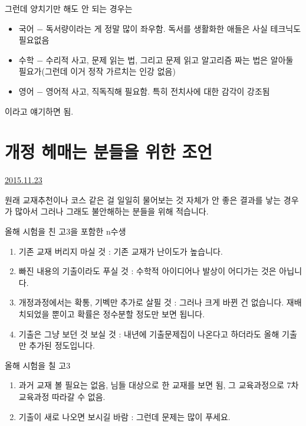 그런데 양치기만 해도 안 되는 경우는
\vspace{5mm}
\begin{itemize}
    \item 국어 $-$ 독서량이라는 게 정말 많이 좌우함. 독서를 생활화한 애들은 사실 테크닉도 필요없음
    \item 수학 $-$ 수리적 사고, 문제 읽는 법, 그리고 문제 읽고 알고리즘 짜는 법은 알아둘 필요가(그런데 이거 정작 가르치는 인강 없음)
    \item 영어 $-$ 영어적 사고, 직독직해 필요함. 특히 전치사에 대한 감각이 강조됨
\end{itemize}
\vspace{5mm}

이라고 얘기하면 됨.
\vspace{5mm}








\section{개정 헤매는 분들을 위한 조언}
\href{https://www.kockoc.com/Apoc/506939}{2015.11.23}

\vspace{5mm}

원래 교재추천이나 코스 같은 걸 일일히 물어보는 것 자체가 안 좋은 결과를 낳는 경우가 많아서 그러나
그래도 불안해하는 분들을 위해 적습니다.
\vspace{5mm}

올해 시험을 친 고3을 포함한 n수생
\vspace{5mm}
\begin{enumerate}
    \item 기존 교재 버리지 마실 것 : 기존 교재가 난이도가 높습니다.
    \item 빠진 내용의 기출이라도 푸실 것 : 수학적 아이디어나 발상이 어디가는 것은 아닙니다.
    \item 개정과정에서는 확통, 기벡만 추가로 살필 것 : 그러나 크게 바뀐 건 없습니다. 재배치되었을 뿐이고 확률은 정수분할 정도만 보면 됩니다.
    \item 기출은 그냥 보던 것 보실 것 : 내년에 기출문제집이 나온다고 하더라도 올해 기출만 추가된 정도입니다.
\end{enumerate}
\vspace{5mm}

올해 시험을 칠 고3
\vspace{5mm}

\begin{enumerate}
    \item 과거 교재 볼 필요는 없음, 님들 대상으로 한 교재를 보면 됨, 그 교육과정으로 7차 교육과정 따라갈 수 없음.
    \item 기출이 새로 나오면 보시길 바람 : 그런데 문제는 많이 푸세요.
\end{enumerate}
\vspace{5mm}

